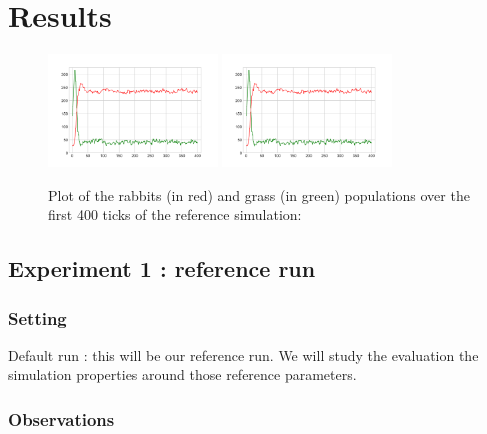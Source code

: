 \documentclass[11pt]{article}
\begin{document}
\section{Results}

\begin{figure}[h!]
    \centering
    \includegraphics[width=0.4\textwidth]{plots/sim1.png}
    \includegraphics[width=0.4\textwidth]{plots/sim1.png}
    \caption{Plot of the rabbits (in red) and grass (in green) populations over the first 400 ticks of the reference simulation:}
  \end{figure}

\subsection{Experiment 1 : reference run}

\subsubsection{Setting}

Default run : this will be our reference run. We will study the evaluation the simulation properties around those reference parameters. 

\subsubsection{Observations}

\end{document}
